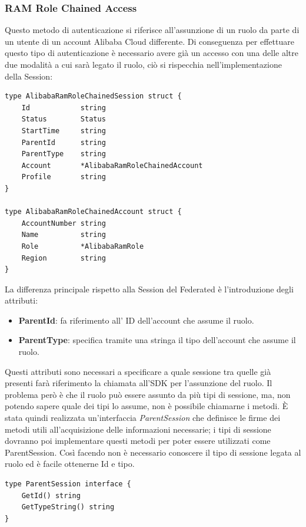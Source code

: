 \documentclass[a4paper]{article}
\begin{document}
\subsubsection{RAM Role Chained Access}
Questo metodo di autenticazione si riferisce all'assunzione di un ruolo da parte di un utente di un account Alibaba Cloud differente. Di conseguenza per effettuare questo tipo di autenticazione è necessario avere già un accesso con una delle altre due modalità a cui sarà legato il ruolo, ciò si rispecchia nell'implementazione della Session:
\begin{lstlisting}[style=customgo, caption=alibaba\_ram\_role\_chained\_session.go (righe 9-29), captionpos=b, firstnumber=9]
type AlibabaRamRoleChainedSession struct {
	Id            string
	Status        Status
	StartTime     string
	ParentId      string
	ParentType    string
	Account       *AlibabaRamRoleChainedAccount
	Profile       string
}

type AlibabaRamRoleChainedAccount struct {
	AccountNumber string
	Name          string
	Role          *AlibabaRamRole
	Region        string
}
\end{lstlisting}
La differenza principale rispetto alla Session del Federated è l'introduzione degli attributi:
\begin{itemize}
    \item \textbf{ParentId}: fa riferimento all' ID dell'account che assume il ruolo.
    \item \textbf{ParentType}: specifica tramite una stringa il tipo dell'account che assume il ruolo.
\end{itemize}
Questi attributi sono necessari a specificare a quale sessione tra quelle già presenti farà riferimento la chiamata all'SDK per l'assunzione del ruolo. Il problema però è che il ruolo può essere assunto da più tipi di sessione, ma, non potendo sapere quale dei tipi lo assume, non è possibile chiamarne i metodi. È stata quindi realizzata un'interfaccia \textit{ParentSession} che definisce le firme dei metodi utili all'acquisizione delle informazioni necessarie; i tipi di sessione dovranno poi implementare questi metodi per poter essere utilizzati come ParentSession. Così facendo non è necessario conoscere il tipo di sessione legata al ruolo ed è facile ottenerne Id e tipo.
\begin{lstlisting}[style=customgo, caption=parent\_interface.go (righe 3-6), captionpos=b, firstnumber=3]
type ParentSession interface {
	GetId() string
	GetTypeString() string
}
\end{lstlisting}
\end{document}
